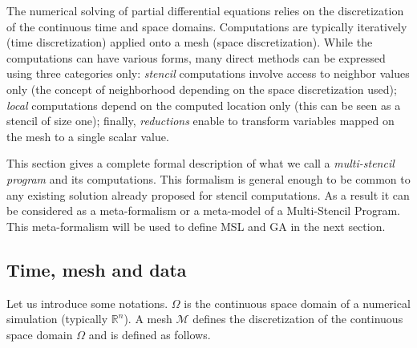 
The numerical solving of partial differential equations relies on the discretization of the continuous time and space domains.
Computations are typically iteratively (time discretization) applied onto a mesh (space discretization).
While the computations can have various forms, many direct methods can be expressed using three categories only:
\emph{stencil} computations involve access to neighbor values only (the concept of neighborhood depending on the space discretization used);
\emph{local} computations depend on the computed location only (this can be seen as a stencil of size one);
finally, \emph{reductions} enable to transform variables mapped on the mesh to a single scalar value.

This section gives a complete formal description of what we call a \textit{multi-stencil program} and its computations. This formalism is general enough to be common to any existing solution already proposed for stencil computations. As a result it can be considered as a meta-formalism or a meta-model of a Multi-Stencil Program. This meta-formalism will be used to define MSL and GA in the next section.

\subsection{Time, mesh and data}

Let us introduce some notations.
$\Omega$ is the continuous space domain of a numerical simulation (typically $\mathbb{R}^n$).
A mesh $\mathcal{M}$ defines the discretization of the continuous space domain $\Omega$ and is defined as follows.

